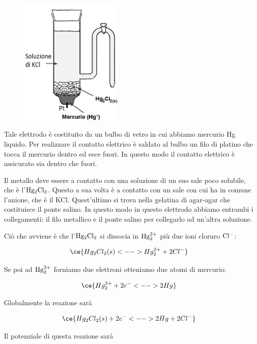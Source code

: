 \begin{minipage}{0.35\textwidth}
    \begin{figure}[H]
        \centering
        \includegraphics[width=5cm]{immagini/Elettrodo_a_calomelano.png}
    \end{figure}
\end{minipage}
\begin{minipage}{0.63\textwidth}
    \vspace{0.4cm}Tale elettrodo è costituito da un bulbo di vetro in cui abbiamo mercurio Hg liquido. Per realizzare il contatto elettrico è saldato al bulbo un filo di platino che tocca il mercurio dentro ed esce fuori. In questo modo il contatto elettrico è assicurato sia dentro che fuori.

    Il metallo deve essere a contatto con una soluzione di un suo sale poco solubile, che è l'$\rm Hg_2Cl_2$. Questo a sua volta è a contatto con un sale con cui ha in comune l'anione, che è il KCl. Quest'ultimo si trova nella gelatina di agar-agar che costituisce il ponte salino. In questo modo in questo elettrodo abbiamo entrambi i collegamenti: il filo metallico e il ponte salino per collegarlo ad un'altra soluzione.
\end{minipage}

\vspace{0.4cm}Ciò che avviene è che l'$\rm Hg_2Cl_2$ si dissocia in $\rm Hg_2^{2+}$ più due ioni cloruro $\rm Cl^-$:

$$\ce{Hg_2Cl_2(s) <--> Hg_2^{2+} + 2Cl^-}$$

Se poi ad $\rm Hg_2^{2+}$ forniamo due elettroni otteniamo due atomi di mercurio:

$$\ce{ Hg_2^{2+} + 2e^- <--> 2Hg}$$

Globalmente la reazione sarà

$$\ce{Hg_2Cl_2(s) + 2e^- <--> 2Hg + 2Cl^-}$$

Il potenziale di questa reazione sarà

